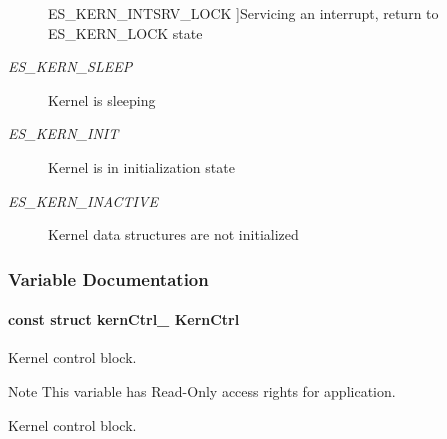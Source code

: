 \begin{Desc}
\begin{description}
{\hypertarget{group__kern__ctrl_ggac9be6bfeddbd6af148cdb3867fbc24afa2b35c503975df4c289e9cbff3e815f8b}{E\-S\-\_\-\-K\-E\-R\-N\-\_\-\-I\-N\-T\-S\-R\-V\-\_\-\-L\-O\-C\-K}\label{group__kern__ctrl_ggac9be6bfeddbd6af148cdb3867fbc24afa2b35c503975df4c289e9cbff3e815f8b}
}]Servicing an interrupt, return to E\-S\-\_\-\-K\-E\-R\-N\-\_\-\-L\-O\-C\-K state \item[{\em 
\hypertarget{group__kern__ctrl_ggac9be6bfeddbd6af148cdb3867fbc24afad45a94c8b4975fd162d683201a75cceb}{E\-S\-\_\-\-K\-E\-R\-N\-\_\-\-S\-L\-E\-E\-P}\label{group__kern__ctrl_ggac9be6bfeddbd6af148cdb3867fbc24afad45a94c8b4975fd162d683201a75cceb}
}]Kernel is sleeping \item[{\em 
\hypertarget{group__kern__ctrl_ggac9be6bfeddbd6af148cdb3867fbc24afacad35dc43528f96d27696db584f05cff}{E\-S\-\_\-\-K\-E\-R\-N\-\_\-\-I\-N\-I\-T}\label{group__kern__ctrl_ggac9be6bfeddbd6af148cdb3867fbc24afacad35dc43528f96d27696db584f05cff}
}]Kernel is in initialization state \item[{\em 
\hypertarget{group__kern__ctrl_ggac9be6bfeddbd6af148cdb3867fbc24afa089165cac55f315953335f5ffe41b7c4}{E\-S\-\_\-\-K\-E\-R\-N\-\_\-\-I\-N\-A\-C\-T\-I\-V\-E}\label{group__kern__ctrl_ggac9be6bfeddbd6af148cdb3867fbc24afa089165cac55f315953335f5ffe41b7c4}
}]Kernel data structures are not initialized \end{description}
\end{Desc}


\subsubsection{Variable Documentation}
\hypertarget{group__kern__ctrl_ga93a7ee7768ffd94201bf1795a543194b}{
\paragraph[{Kern\-Ctrl}]{\setlength{\rightskip}{0pt plus 5cm}const struct {\bf kern\-Ctrl\-\_\-} Kern\-Ctrl}}\label{group__kern__ctrl_ga93a7ee7768ffd94201bf1795a543194b}


Kernel control block. 

\begin{DoxyNote}{Note}
This variable has Read-\/\-Only access rights for application.
\end{DoxyNote}
Kernel control block. 